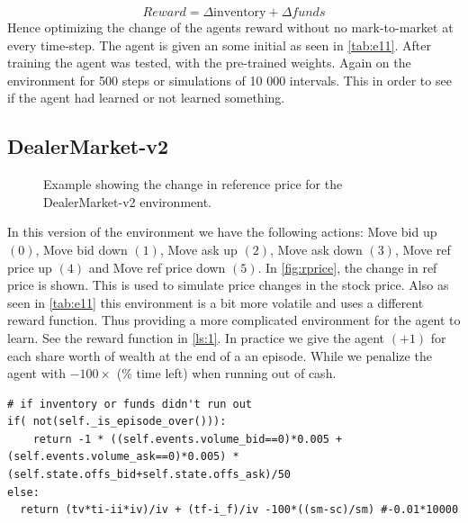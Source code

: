 \documentclass{kththesis}
\theoremstyle{definition}
\begin{document}
\begin{equation}
    \label{eq:m7}
    Reward = \Delta \text{inventory} + \Delta funds
\end{equation}
Hence optimizing the change of the agents reward without no mark-to-market at every time-step. The agent is given an some initial as seen in \autoref{tab:e11}. After training the agent was tested,  with the pre-trained weights. Again on the environment for 500 steps or simulations of 10 000 intervals. This in order to see if the agent had learned or not learned something. 


\subsection{DealerMarket-v2}
\begin{figure}[H]
	    	\centering
		
		\caption{Example showing the change in reference price for the DealerMarket-v2 environment. }
		\label{fig:rprice}
\end{figure}
In this version of the environment we have the following actions: Move bid up $(0)$, Move bid down $(1)$, Move ask up $(2)$,  Move ask down $(3)$,  Move ref price up $(4)$ and Move ref price down $(5)$. In \autoref{fig:rprice}, the change in ref price is shown. This is used to simulate price changes in the stock price. Also as seen in \autoref{tab:e11} this environment is a bit more volatile and uses a different reward function. Thus providing a more complicated environment for the agent to learn. See the reward function in \autoref{ls:1}. In practice we give the agent $(+1)$ for each share worth of wealth at the end of a an episode. While we penalize the agent with $- 100 \times$ (\% time left) when running out of cash.

\newpage
\begin{lstlisting}[caption={Reward function for DealerMarket-V2, tv-true price, ti-inventory, ii-inital inventory, iv-inital value, tf-funds, i\_f-inital funds, sc-current step and sm-maximum step.},captionpos=b, label=ls:1]
# if inventory or funds didn't run out
if( not(self._is_episode_over())):   
    return -1 * ((self.events.volume_bid==0)*0.005 + (self.events.volume_ask==0)*0.005) * (self.state.offs_bid+self.state.offs_ask)/50
else: 
  return (tv*ti-ii*iv)/iv + (tf-i_f)/iv -100*((sm-sc)/sm) #-0.01*10000

\end{lstlisting}
\end{document}

